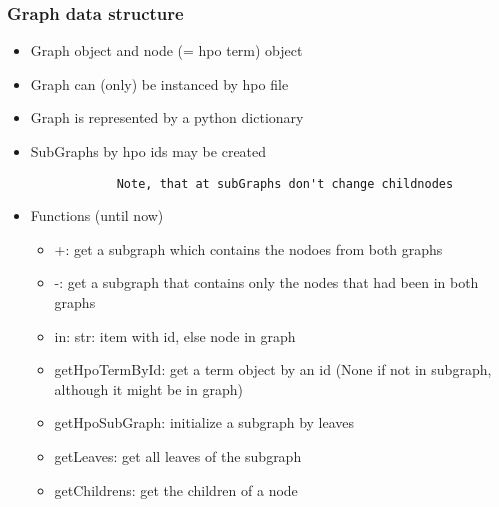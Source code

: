 \documentclass{beamer}
\begin{document}
\begin{frame}[fragile]
 \frametitle{Graph data structure}

\begin{itemize}
	\item Graph object and node (= hpo term) object
	\item Graph can (only) be instanced by hpo file
	\item Graph is represented by a python dictionary
	\item SubGraphs by hpo ids may be created
		\begin{verbatim}
			Note, that at subGraphs don't change childnodes
		\end{verbatim}
	\item Functions (until now)
		\begin{itemize}
			\item +: get a subgraph which contains the nodoes from both graphs
			\item -: get a subgraph that contains only the nodes that had been in both graphs
			\item in: str: item with id, else node in graph
			\item getHpoTermById: get a term object by an id (None if not in subgraph, although it might be in graph)
			\item getHpoSubGraph: initialize a subgraph by leaves
			\item getLeaves: get all leaves of the subgraph
			\item getChildrens: get the children of a node
		\end{itemize}
\end{itemize}

\end{frame}
\end{document}
